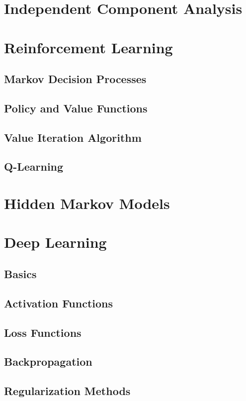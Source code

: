\documentclass[twoside,twocolumn]{article}
\begin{document}
\section{Independent Component Analysis}
\section{Reinforcement Learning}
\subsection{Markov Decision Processes}
\subsection{Policy and Value Functions}
\subsection{Value Iteration Algorithm}
\subsection{Q-Learning}
\section{Hidden Markov Models}
\section{Deep Learning}
\subsection{Basics}
\subsection{Activation Functions}
\subsection{Loss Functions}
\subsection{Backpropagation}
\subsection{Regularization Methods}
\end{document}
